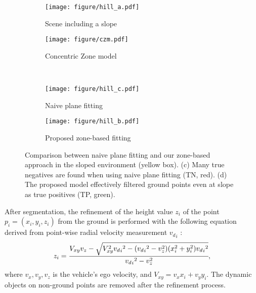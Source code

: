 \begin{figure}[!t]
    \centering
    \begin{subfigure}[b]{0.45\columnwidth}
        \texttt{[image: figure/hill\_a.pdf]}
        \caption{Scene including a slope}
        \label{fig:hill_a}
    \end{subfigure}
    \begin{subfigure}[b]{0.45\columnwidth}
        \texttt{[image: figure/czm.pdf]}
        \caption{Concentric Zone model}
        \label{fig:hill_b}
    \end{subfigure}
    \\
    \begin{subfigure}[b]{0.45\columnwidth}
        \texttt{[image: figure/hill\_c.pdf]}
        \caption{Naive plane fitting}
        \label{fig:hill_c}
    \end{subfigure}
    \begin{subfigure}[b]{0.45\columnwidth}
        \texttt{[image: figure/hill\_b.pdf]}
        \caption{Proposed zone-based fitting}
        \label{fig:hill_d}
    \end{subfigure}
    \caption{
    Comparison between naive plane fitting and our zone-based approach in the sloped environment (yellow box). (c) Many true negatives are found when using naive plane fitting (TN, red). (d) The proposed model effectively filtered ground points even at slope as true positives (TP, green).}
    \label{fig:ground}
    \vspace{-7mm}
\end{figure}



After segmentation, the refinement of the height value $z_i$ of the point $p_i=
(x_i,y_i,z_i)$ from the ground is performed with the following equation derived from point-wise radial velocity measurement ${v_d}_i$ \cite{DoerENC2020}:
\vspace{-2mm}
\begin{equation}
    z_i=\cfrac{V_{xy}v_z - \sqrt{V_{xy}^2{{v_d}_i}^2 - ({{v_d}_i}^2-v_z^2)(x_i^2+y_i^2){{v_d}_i}^2}}{{{v_d}_i}^2-v_z^2},
    \vspace{-2mm}
\end{equation}
where $v_x, v_y, v_z$ is the vehicle's ego velocity, and $V_{xy}=v_x x_i+v_y y_i$. The dynamic objects on non-ground points are removed after the refinement process.



